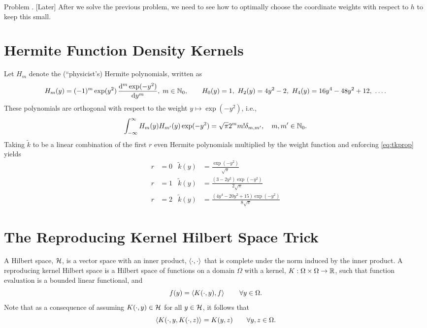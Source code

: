 \documentclass[letterpaper]{amsart}
\newcommand{\tk}{\tilde{k}}
\newcounter{probcnt}
\newenvironment{Problem}{\bigskip \LARGE \color{red} \refstepcounter{probcnt} \noindent Problem \theprobcnt. }{\normalsize \color{black} \bigskip}
\begin{document}
\begin{Problem} [Later]
    After we solve the previous problem, we need to see how to optimally choose the coordinate weights with respect to $h$ to keep this small.
\end{Problem}



\section{Hermite Function Density Kernels}

Let $H_m$ denote the (``physicist's) Hermite polynomials, written as
\begin{equation*}
	H_m(y) = (-1)^m \exp(y^2) \, \frac{\dif^m \exp(-y^2)}{\dif y^m}, \; m \in \natzero, \qquad
	H_0(y) = 1, \ H_2(y) = 4y^2-2, \ H_4(y) = 16 y^4 - 48 y^2 + 12, \ \ldots.
\end{equation*}
These polynomials are orthogonal with respect to the weight $y \mapsto \exp(-y^2)$, i.e.,
\begin{equation*}
	\int_{-\infty}^{\infty} H_m(y) H_{m'}(y) \exp(-y^2) = \sqrt{\pi} 2^m m! \delta_{m,m'}, \quad m,m' \in \mathbb{N}_{0}.
\end{equation*}
Taking $\tk$ to be a linear combination of the first $r$ even Hermite polynomials multiplied by the weight function and enforcing \eqref{eq:tkprop} yields
\begin{align*}
	r& = 0  & \tk(y) &= \frac{\exp(-y^2)}{\sqrt{\pi}}
		\\
	r& = 1 &  \tk(y) & =\frac{\left(3 - 2y^{2}\right) \exp(- y^{2})}{2\sqrt{\pi}} \\
	r &= 2 & \tk(y) & = \frac{\left(4 y^{4} - 20 y^{2} + 15\right) \exp(- y^{2})}{8 \sqrt{\pi}}
\end{align*}




\appendix

\section{The Reproducing Kernel Hilbert Space Trick} \label{app:rkhs}
A Hilbert space, $\mathcal{H}$, is a vector space with an inner product, $\left \langle \cdot, \cdot \right \rangle_{{}}$ that is complete under the norm induced by the inner product.  A reproducing kernel Hilbert space \cite{RKHSwiki} is a Hilbert space of functions on a domain $\Omega$ with a kernel, $K:\Omega \times \Omega \to \mathbb{R}$, such that function evaluation is a bounded linear functional, and
\begin{equation} \label{eq:repproperty}
    f(y) = \left \langle K(\cdot,y), f \right \rangle_{{}} \qquad \forall y \in \Omega.
\end{equation}
Note that as a consequence of assuming $K(\cdot,y) \in \mathcal{H}$ for all $y\in \mathcal{H}$, it follows that
\begin{equation} \label{eq:rkip}
    \left \langle K(\cdot,y, K(\cdot, z) \right \rangle_{{}} = K(y,z) \qquad \forall y,z \in \Omega.
\end{equation}
\end{document}
